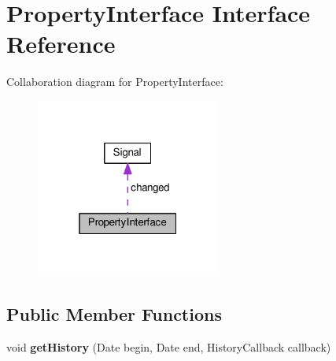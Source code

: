 \hypertarget{interfacePropertyInterface}{\section{Property\+Interface Interface Reference}
\label{interfacePropertyInterface}
}


Collaboration diagram for Property\+Interface\+:\nopagebreak
\begin{figure}[H]
\begin{center}
\leavevmode
\includegraphics[width=172pt]{interfacePropertyInterface__coll__graph}
\end{center}
\end{figure}
\subsection*{Public Member Functions}
\begin{DoxyCompactItemize}
\item 
\hypertarget{interfacePropertyInterface_ae1e13ad51c95d246c699e455eb0f62e7}{void {\bfseries get\+History} (Date begin, Date end, History\+Callback callback)}\label{interfacePropertyInterface_ae1e13ad51c95d246c699e455eb0f62e7}

\end{DoxyCompactItemize}
